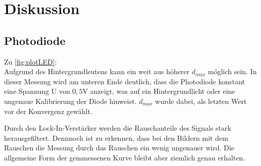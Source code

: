 \newpage
\section{Diskussion}
\subsection{Photodiode}
Zu \ref{fig:plotLED}:\\
Aufgrund des Hintergrundleutens kann ein weit aus höherer $d_{max}$ 
möglich sein. In dieser Messung wird am unteren Ende deutlich, dass die Photodiode
konstant eine Spannung U von $0,5$V anzeigt, was auf ein Hintergrundlicht oder eine 
ungenaue Kalibrierung der Diode hinweist. $d_{max}$ wurde dabei, als letzten Wert
vor der Konvergenz gewählt.


\label{sec:Diskussion}
Durch den Lock-In-Verstärker werden die Rauschanteile des Signals stark herausgefiltert.
Dennnoch ist zu erkennen, dass bei den Bildern mit dem Rauschen die Messung durch das Rauschen ein wenig ungenauer wird.
Die allgemeine Form der gemmessenen Kurve bleibt aber ziemlich genau erhalten.